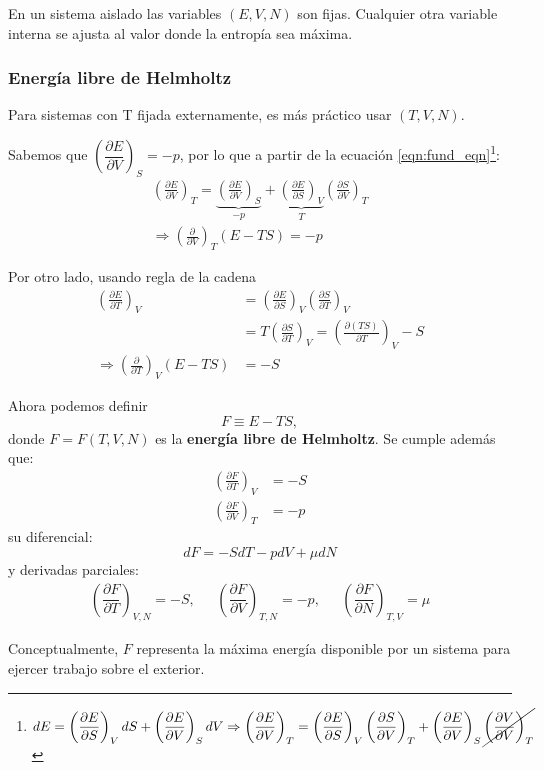 \documentclass[]{article}
\numberwithin{equation}{section}
\newcommand{\deriv}[3]{\left(\frac{\partial #1}{\partial #2} \right)_{#3}}
\newcommand{\dderiv}[3]{\left(\dfrac{\partial #1}{\partial #2} \right)_{#3}}
\newcommand{\0}{\textcolor{gray}{0}}
\begin{document}
En un sistema aislado las variables $(E,V,N)$ son fijas. Cualquier otra variable interna se ajusta al valor donde la entropía sea máxima.

\subsubsection{Energía libre de Helmholtz}
Para sistemas con T fijada externamente, es más práctico usar $(T,V,N)$.

Sabemos que \(\dderiv{E}{V}{S} = -p\), por lo que a partir de la ecuación \ref{eqn:fund_eqn}\footnote{\(dE = \dderiv{E}{S}{V}dS + \dderiv{E}{V}{S}dV \Rightarrow \dderiv{E}{V}{T} = \dderiv{E}{S}{V} \dderiv{S}{V}{T} + \dderiv{E}{V}{S}\cancel{\dderiv{V}{V}{T}}\)}:
\begin{align}
	\deriv{E}{V}{T} = \underbrace{\deriv{E}{V}{S}}_{-p} + \underbrace{\deriv{E}{S}{V}}_{T}\deriv{S}{V}{T}\nonumber\\
	\Rightarrow\deriv{}{V}{T}(E-TS) = -p
\end{align}

Por otro lado, usando regla de la cadena
\begin{align}
	\deriv{E}{T}{V} &= \deriv{E}{S}{V}\deriv{S}{T}{V}\nonumber\\
	&= T\deriv{S}{T}{V} = \deriv{(TS)}{T}{V} - S\nonumber\\
	\Rightarrow\deriv{}{T}{V}(E-TS) &= -S
\end{align}

Ahora podemos definir
\begin{equation}
	F \equiv E-TS,
\end{equation}
donde $F=F(T,V,N)$ es la \textbf{energía libre de Helmholtz}. Se cumple además que:
\begin{align}
	\deriv{F}{T}{V} &= -S\\
	\deriv{F}{V}{T} &= -p
\end{align}
su diferencial:
\begin{equation}
	dF = -SdT - pdV + \mu dN
\end{equation}
y derivadas parciales:
\begin{equation}
	\begin{matrix}
		\dderiv{F}{T}{V,N} = -S,\ \ \ & \dderiv{F}{V}{T,N} = -p,\ \ \ & \dderiv{F}{N}{T,V} = \mu
	\end{matrix}
	\label{relaciones_F}
\end{equation}

Conceptualmente, \(F\) representa la máxima energía disponible por un sistema para ejercer trabajo sobre el exterior.
\end{document}
